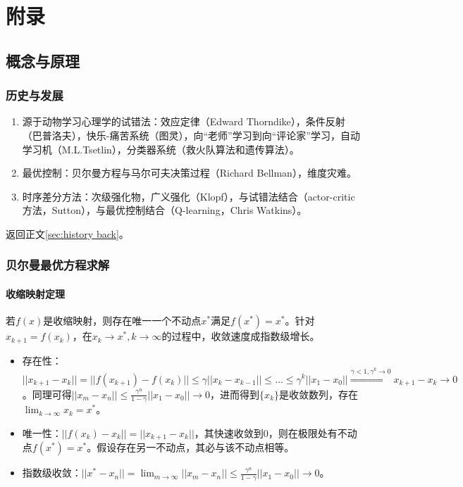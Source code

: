\documentclass[
12pt, %
a4paper, 
oneside, %
headinclude,footinclude, %
]{scrartcl}
\begin{document}
\section{附录}
\subsection[概念与原理]{概念与原理}
\subsubsection[历史与发展]{历史与发展}\label{sec:history}
\begin{enumerate}
\item 源于动物学习心理学的试错法：效应定律（Edward Thorndike），条件反射（巴普洛夫），快乐-痛苦系统（图灵），向“老师”学习到向“评论家”学习，自动学习机（M.L.Tsetlin），分类器系统（救火队算法和遗传算法）。
\item 最优控制：贝尔曼方程与马尔可夫决策过程（Richard Bellman），维度灾难。
\item 时序差分方法：次级强化物，广义强化（Klopf），与试错法结合（actor-critic方法，Sutton），与最优控制结合（Q-learning，Chris Watkins）。
\end{enumerate}

返回正文\ref{sec:history back}。
\subsubsection[贝尔曼最优方程求解]{贝尔曼最优方程求解}\label{sec:Scalability Mapping}
\paragraph{收缩映射定理}
若$ f(x) $是收缩映射，则存在唯一一个不动点$ x^* $满足$ f(x^*) = x^* $。针对$ x_{k + 1} = f(x_k) $，在$ x_k \to x^*, k \to \infty $的过程中，收敛速度成指数级增长。
\begin{itemize}
\item 存在性：$ ||x_{k + 1} - x_k|| = ||f(x_{k + 1}) - f(x_k)|| \leq \gamma||x_k - x_{k - 1}|| \leq \dots \leq \gamma^k||x_1 - x_0|| \overset{\gamma < 1, \gamma^k \to 0}{\Longrightarrow} x_{k + 1} - x_k \to 0 $。同理可得$ ||x_m - x_n|| \leq \frac{\gamma^n}{1 - \gamma}||x_1 - x_0|| \to 0 $，进而得到$ \{x_k\} $是收敛数列，存在$ \lim_{k \to \infty} x_k = x^* $。
\item 唯一性：$ ||f(x_k) - x_k|| = ||x_{k + 1} - x_k|| $，其快速收敛到$ 0 $，则在极限处有不动点$ f(x^*) = x^* $。假设存在另一不动点，其必与该不动点相等。
\item 指数级收敛：$ ||x^* - x_n|| = \lim_{m \to \infty}||x_m - x_n|| \leq \frac{\gamma^n}{1 - \gamma}||x_1 - x_0|| \to 0 $。
\end{itemize}
\end{document}
